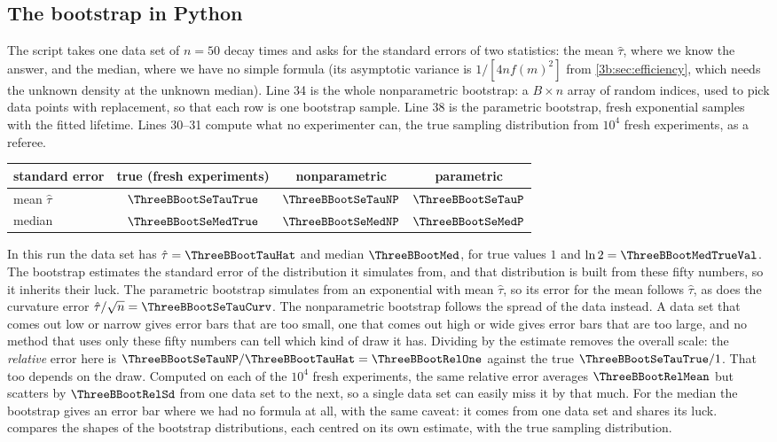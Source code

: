 \subsection{The bootstrap in Python}
\label{3b:sec:boot-python}

The script  takes one data set of $n=50$ decay
times and asks for the standard errors of two statistics: the mean
$\hat\tau$, where we know the answer, and the median, where we have no
simple formula (its asymptotic variance is $1/[4nf(m)^2]$ from
\cref{3b:sec:efficiency}, which needs the unknown density at the unknown
median).
Line 34 is the whole nonparametric bootstrap: a $B\times n$ array of random
indices, used to pick data points with replacement, so that each row is one
bootstrap sample. Line 38 is the parametric bootstrap, fresh exponential
samples with the fitted lifetime. Lines 30--31 compute what no experimenter
can, the true sampling distribution from $10^4$ fresh experiments, as a
referee.

\begin{center}
\small
\begin{tabular}{lccc}
  \hline
  standard error & true (fresh experiments) & nonparametric & parametric\\
  \hline
  mean $\hat\tau$ & $\ThreeBBootSeTauTrue$ & $\ThreeBBootSeTauNP$ & $\ThreeBBootSeTauP$\\
  median & $\ThreeBBootSeMedTrue$ & $\ThreeBBootSeMedNP$ & $\ThreeBBootSeMedP$\\
  \hline
\end{tabular}
\end{center}
In this run the data set has $\hat\tau=\ThreeBBootTauHat$ and median
$\ThreeBBootMed$, for true values $1$ and $\ln2=\ThreeBBootMedTrueVal$.
The bootstrap estimates the standard error of the distribution it simulates
from, and that distribution is built from these fifty numbers, so it
inherits their luck. The parametric bootstrap simulates from an exponential
with mean $\hat\tau$, so its error for the mean follows $\hat\tau$, as does
the curvature error $\hat\tau/\sqrt n=\ThreeBBootSeTauCurv$. The
nonparametric bootstrap follows the spread of the data instead. A data set
that comes out low or narrow gives error bars that are too small, one that
comes out high or wide gives error bars that are too large, and no method
that uses only these fifty numbers can tell which kind of draw it has.
Dividing by the estimate removes the overall scale: the \emph{relative}
error here is $\ThreeBBootSeTauNP/\ThreeBBootTauHat=\ThreeBBootRelOne$
against the true $\ThreeBBootSeTauTrue/1$. That too depends on the draw.
Computed on each of the $10^4$ fresh experiments, the same relative error
averages $\ThreeBBootRelMean$ but scatters by $\ThreeBBootRelSd$ from one
data set to the next, so a single data set can easily miss it by that much.
For the median the bootstrap gives an error bar where we had no formula at
all, with the same caveat: it comes from one data set and shares its luck.  compares the shapes of the bootstrap
distributions, each centred on its own estimate, with the true sampling
distribution.

